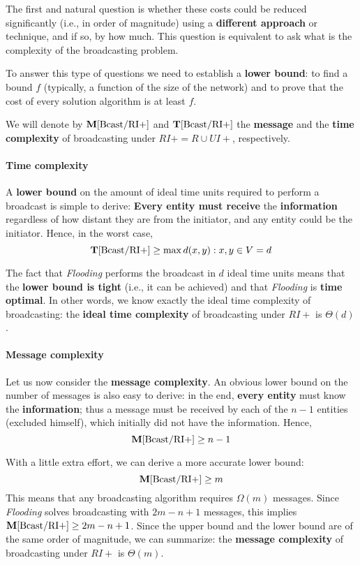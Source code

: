 The first and natural question is whether these costs could be reduced significantly (i.e., in order of magnitude) using a \textbf{different approach} or technique, and if so, by how much. This question is equivalent to ask what is the complexity of the broadcasting problem. 

To answer this type of questions we need to establish a \textbf{lower bound}: to find a bound $f$ (typically, a function of the size of the network) and to prove that the cost of every solution algorithm is at least $f$. 

We will denote by $\mathbf{M}[\text{Bcast/RI+}]$ and $\mathbf{T}[\text{Bcast/RI+}]$ the \textbf{message} and the \textbf{time complexity} of broadcasting under $RI+ = R \cup UI+$, respectively. 

\paragraph{Time complexity}
A \textbf{lower bound} on the amount of ideal time units required to perform a broadcast is simple to derive: \textbf{Every entity must receive} the \textbf{information} regardless of how distant they are from the initiator, and any entity could be the initiator. Hence, in the worst case,
$$\mathbf{T}[\text{Bcast/RI+}] \geq \max{d(x, y): x, y \in V}= d$$

The fact that \textit{Flooding} performs the broadcast in $d$ ideal time units means that the \textbf{lower bound is tight} (i.e., it can be achieved) and that \textit{Flooding} is \textbf{time optimal}. In other words, we know exactly the ideal time complexity of broadcasting: the \textbf{ideal time complexity} of broadcasting under $RI+$ is $\Theta(d)$.

\paragraph{Message complexity}
Let us now consider the \textbf{message complexity}. An obvious lower bound on the number of messages is also easy to derive: in the end, \textbf{every entity} must know the \textbf{information}; thus a message must be received by each of the $n-1$ entities (excluded himself), which initially did not have the information. Hence,
$$\mathbf{M}[\text{Bcast/RI+}] \geq n - 1$$

With a little extra effort, we can derive a more accurate lower bound:
$$\mathbf{M}[\text{Bcast/RI+}] \geq m$$
This means that any broadcasting algorithm requires $\Omega(m)$ messages. Since \textit{Flooding} solves broadcasting with $2m - n + 1$ messages, this implies $\mathbf{M}[\text{Bcast/RI+}] \geq 2m - n + 1$. Since the upper bound and the lower bound are of the same order of magnitude, we can summarize: the \textbf{message complexity} of broadcasting under $RI+$ is $\Theta(m)$.

